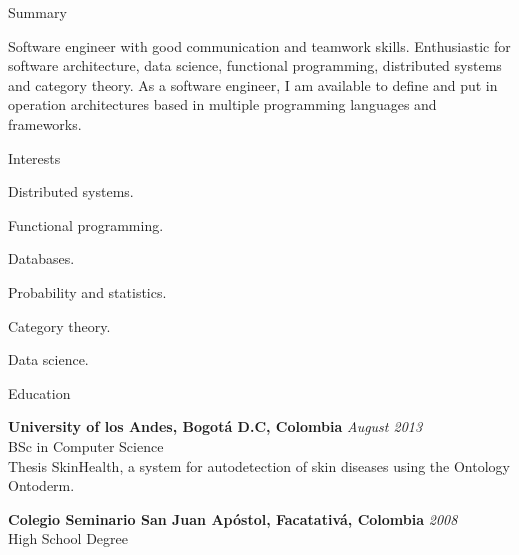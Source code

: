 \documentclass[spanish]{resume}
\begin{document}

\begin{rSection}{Summary}

Software engineer with good communication and teamwork skills. Enthusiastic for software architecture, data science, functional programming, distributed systems and category theory. As a software engineer, I am available to define and put in operation architectures based in multiple programming languages and frameworks. 

\end{rSection}

\begin{rSection}{Interests}

\item Distributed systems.
\item Functional programming.
\item Databases.
\item Probability and statistics.
\item Category theory.
\item Data science.


\end{rSection}


\begin{rSection}{Education}

{\bf University of los Andes, Bogot\'a D.C, Colombia} \hfill {\em August 2013} \\
BSc in Computer Science \\
Thesis SkinHealth, a system for autodetection of skin diseases using the Ontology Ontoderm.

{\bf Colegio Seminario San Juan Ap\'ostol, Facatativ\'a, Colombia} \hfill {\em 2008} \\
 High School Degree

\end{rSection}
\end{document}
